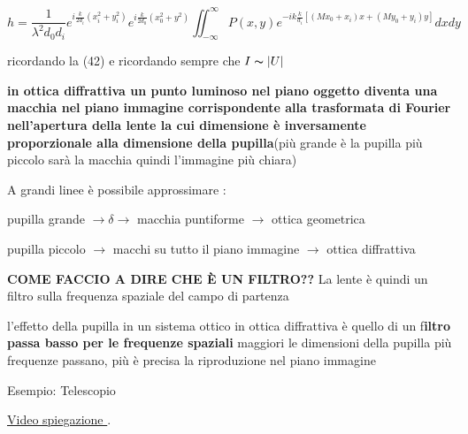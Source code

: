 \documentclass{article}
\begin{document}
\begin{equation}
h= \frac{1}{\lambda^{2} d_{0} d_{i}} e ^{i \frac{k}{2 d_{i}}(x_{i}^{2}+y_{i}^{2})} e ^{i \frac{k}{2 d_{0}}(x_{0}^{2}+y_{}^{2})} \iint_{-\infty}^{\infty} P(x,y)  e^{- i k \frac{k}{d_{i}} [(M x_{0} + x_{i}) x + (M y_{0} + y_{i})y]} dxdy
\end{equation}

ricordando la (42)  e ricordando sempre che $ I \thicksim |U|$


\textbf{in ottica diffrattiva un punto luminoso nel piano oggetto diventa una macchia nel piano immagine corrispondente alla trasformata di Fourier nell'apertura della lente la cui dimensione è inversamente proporzionale alla dimensione della pupilla}(più grande è la pupilla più piccolo sarà la macchia quindi l'immagine più chiara)


A grandi linee è possibile approssimare :

pupilla grande $\rightarrow \delta \rightarrow$ macchia puntiforme $\rightarrow$ ottica geometrica

pupilla piccolo $\rightarrow$ macchi su tutto il piano immagine $\rightarrow$ ottica diffrattiva 

\textbf{COME FACCIO A DIRE CHE È UN FILTRO??}
La lente è quindi un filtro sulla frequenza spaziale del campo di partenza 

l'effetto della pupilla in un sistema ottico in ottica diffrattiva è quello di un f\textbf{iltro passa basso per le frequenze spaziali} maggiori le dimensioni della pupilla più frequenze passano, più è precisa la riproduzione nel piano immagine

Esempio: Telescopio














\href{https://www.youtube.com/watch?v=T8r3cWM4JII&t=47s}{Video spiegazione }.  %








 
\end{document}
